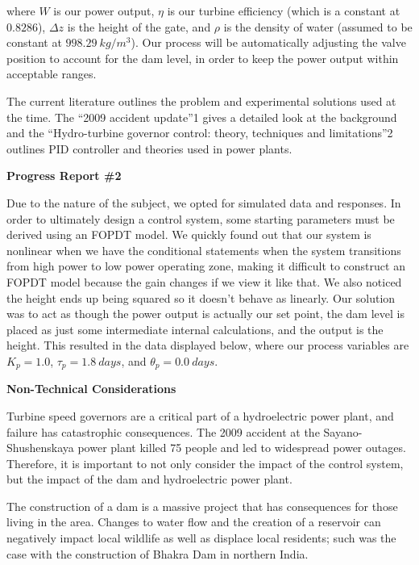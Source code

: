 \documentclass{article}
\begin{document}
\begin{multicols*}{2}
        where $W$ is our power output, $\eta$ is our turbine efficiency (which is a constant at $0.8286$), $\Delta z$ is the height of the gate, and $\rho$ is the density of water (assumed to be constant at $998.29\ kg/m^3$). Our process will be automatically adjusting the valve position to account for the dam level, in order to keep the power output within acceptable ranges.

        The current literature outlines the problem and experimental solutions used at the time. The “2009 accident update”1  gives a detailed look at the background and the “Hydro-turbine governor control: theory, techniques and limitations”2 outlines PID controller and theories used in power plants.

        \begin{center}
            \textbf{Progress Report \#2}
        \end{center}

        Due to the nature of the subject, we opted for simulated data and responses.  In order to ultimately design a control system, some starting parameters must be derived using an FOPDT model.  We quickly found out that our system is nonlinear when we have the conditional statements when the system transitions from high power to low power operating zone, making it difficult to construct an FOPDT model because the gain changes if we view it like that.  We also noticed the height ends up being squared so it doesn’t behave as linearly.  Our solution was to act as though the power output is actually our set point, the dam level is placed as just some intermediate internal calculations, and the output is the height. This resulted in the data displayed below, where our process variables are $K_p = 1.0$, $\tau_p = 1.8\ days$, and $\theta_p = 0.0\ days$.

        \begin{center}
            \textbf{Non-Technical Considerations}
        \end{center}

        Turbine speed governors are a critical part of a hydroelectric power plant, and failure has catastrophic consequences. The 2009 accident at the Sayano-Shushenskaya power plant killed 75 people and led to widespread power outages. Therefore, it is important to not only consider the impact of the control system, but the impact of the dam and hydroelectric power plant.

        The construction of a dam is a massive project that has consequences for those living in the area. Changes to water flow and the creation of a reservoir can negatively impact local wildlife as well as displace local residents; such was the case with the construction of Bhakra Dam in northern India. 


\end{multicols*}
\end{document}
